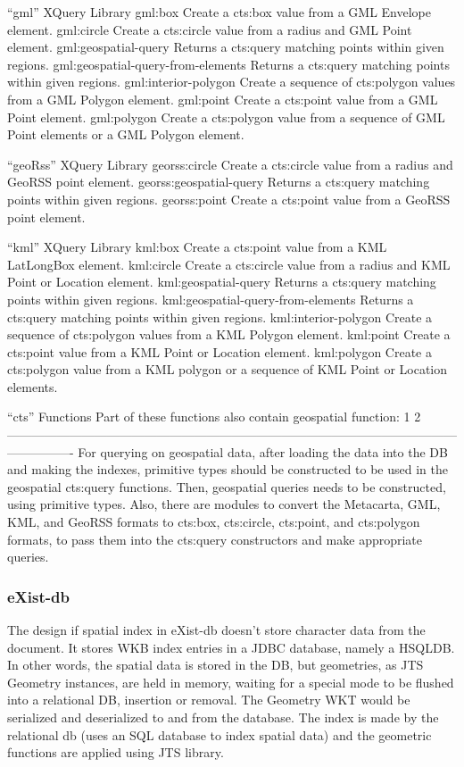 \documentclass[a4paper,12pt]{article}
\begin{document}
“gml” XQuery Library
gml:box
Create a cts:box value from a GML Envelope element.
gml:circle
Create a cts:circle value from a radius and GML Point element.
gml:geospatial-query
Returns a cts:query matching points within given regions.
gml:geospatial-query-from-elements
Returns a cts:query matching points within given regions.
gml:interior-polygon
Create a sequence of cts:polygon values from a GML Polygon element.
gml:point
Create a cts:point value from a GML Point element.
gml:polygon
Create a cts:polygon value from a sequence of GML Point elements or a GML Polygon element.


“geoRss” XQuery Library
georss:circle
Create a cts:circle value from a radius and GeoRSS point element.
georss:geospatial-query
Returns a cts:query matching points within given regions.
georss:point
Create a cts:point value from a GeoRSS point element.

“kml” XQuery Library
kml:box
Create a cts:point value from a KML LatLongBox element.
kml:circle
Create a cts:circle value from a radius and KML Point or Location element.
kml:geospatial-query
Returns a cts:query matching points within given regions.
kml:geospatial-query-from-elements
Returns a cts:query matching points within given regions.
kml:interior-polygon
Create a sequence of cts:polygon values from a KML Polygon element.
kml:point
Create a cts:point value from a KML Point or Location element.
kml:polygon
Create a cts:polygon value from a KML polygon or a sequence of KML Point or Location elements.


“cts” Functions
Part of these functions also contain geospatial function: 1 2
----------------------------------------------------------------------------------------------------------------------------
For querying on geospatial data, after loading the data into the DB and making the indexes, primitive types should be constructed to be used in the geospatial cts:query functions. Then, geospatial queries needs to be constructed, using primitive types. 
Also, there are modules to convert the Metacarta, GML, KML, and GeoRSS formats to cts:box, cts:circle, cts:point, and cts:polygon formats, to pass them into the cts:query constructors and make appropriate queries.

\subsubsection{eXist-db}
The design if spatial index in eXist-db doesn't store character data from the document. It stores WKB index entries in a JDBC database, namely a HSQLDB. In other words, the spatial data is stored in the DB, but geometries, as JTS Geometry instances, are held in memory, waiting for a special mode to be flushed into a relational DB, insertion or removal. The Geometry WKT would be serialized and deserialized to and from the database.
The index is made by the relational db (uses an SQL database to index spatial data) and the geometric functions are applied using JTS library.
\end{document}
